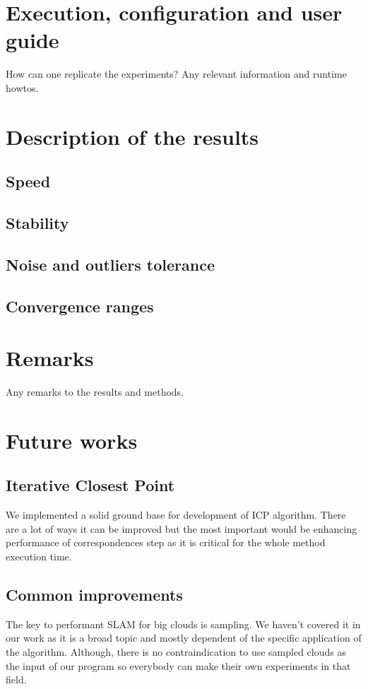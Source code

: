 \documentclass[titlepage]{article}
\begin{document}
\section{Execution, configuration and user guide}
How can one replicate the experiments?
Any relevant information and runtime howtos.

\section{Description of the results}

\subsection{Speed}

\subsection{Stability}

\subsection{Noise and outliers tolerance}

\subsection{Convergence ranges}

\section{Remarks}
Any remarks to the results and methods.

\section{Future works}

\subsection{Iterative Closest Point}
We implemented a solid ground base for development of ICP algorithm. There are a lot of ways it can be improved but the most important would be enhancing performance of correspondences step as it is critical for the whole method execution time. 

\subsection{Common improvements}
The key to performant SLAM for big clouds is sampling. We haven't covered it in our work as it is a broad topic and mostly dependent of the specific application of the algorithm. Although, there is no contraindication to use sampled clouds as the input of our program so everybody can make their own experiments in that field.

\newpage
\printbibliography
\end{document}

